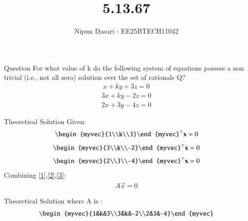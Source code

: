 \documentclass{beamer}
\title %
{5.13.67}
\author %
{Nipun Dasari - EE25BTECH11042}
\begin{document}
	
	\frame{\titlepage}
	\begin{frame}{Question}
		For what value of k do the following system of equations possess a non trivial (i.e.,
		not all zero) solution over the set of rationals Q?
		\begin{align}
			x + ky + 3z = 0
		\end{align}
		\begin{align}
			3x+ky-2z=0%
		\end{align}
		\begin{align}
			2x+3y-4z=0%
		\end{align}
		
	\end{frame}
	
	
	\begin{frame}{Theoretical Solution}
		Given:
		\begin{align}
			\begin{myvec}{1\\k\\3}\end{myvec}^\top\vec{x} = 0 \label{1}
		\end{align}
		\begin{align}
			\begin{myvec}{3\\k\\-2}\end{myvec}^\top\vec{x} = 0\label{2}
		\end{align}
		\begin{align}
			\begin{myvec}{2\\3\\-4}\end{myvec}^\top\vec{x} = 0\label{3}
		\end{align}
		Combining \eqref{1},\eqref{2},\eqref{3}:
		\begin{align}
			A\vec{x}=0
		\end{align}
	\end{frame}
	\begin{frame}{Theoretical Solution}
		where A is :
		\begin{align}
			\begin{myvec}{1&k&3\\3&k&-2\\2&3&-4}\end{myvec}
		\end{align}
	\end{frame}
\end{document}

